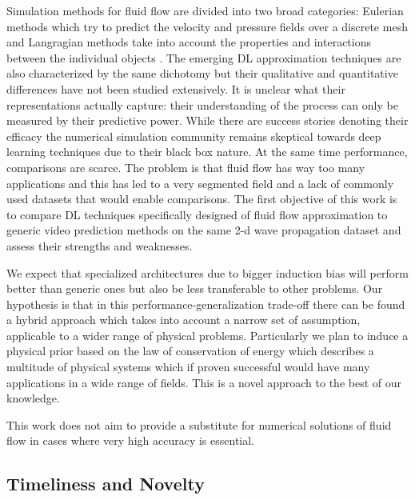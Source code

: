 \documentclass[a4paper,11pt]{article}
\begin{document}
Simulation methods for fluid flow are divided into two broad categories:  Eulerian methods which try to predict the velocity and pressure fields over a discrete mesh and Langragian methods take into account the properties and interactions between the individual objects \cite{zhang2007comparison}. The emerging DL approximation techniques are also characterized by the same dichotomy but their qualitative and quantitative differences have not been studied extensively. It is unclear what their representations actually capture: their understanding of the process can only be measured by their predictive power. While there are success stories denoting their efficacy \cite{tompson2017accelerating} the numerical simulation community remains skeptical towards deep learning techniques due to their black box nature. At the same time performance, comparisons are scarce. The problem is that fluid flow has way too many applications and this has led to a very segmented field and a lack of commonly used datasets that would enable comparisons. The first objective of this work is to compare DL techniques specifically designed of fluid flow approximation to generic video prediction methods on the same 2-d wave propagation dataset and assess their strengths and weaknesses.

We expect that specialized architectures due to bigger induction bias will perform better than generic ones but also be less transferable to other problems. Our hypothesis is that in this performance-generalization trade-off there can be found a hybrid approach which takes into account a narrow set of assumption, applicable to a wider range of physical problems. Particularly we plan to induce a physical prior based on the law of conservation of energy which describes a multitude of physical systems which if proven successful would have many applications in a wide range of fields. This is a novel approach to the best of our knowledge.

This work does not aim to provide a substitute for numerical solutions of fluid flow in cases where very high accuracy is essential.

\subsection{Timeliness and Novelty}
\vskip -2mm
\end{document}
